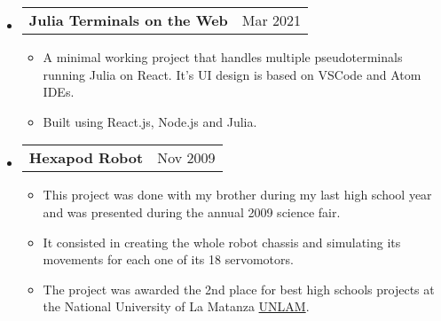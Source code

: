 \documentclass[letterpaper,12pt]{article}[leftmargin=*]
\makeatletter
\def \entryspacing {-0pt}
\newcommand{\resumeEntryStart}{\begin{itemize}[leftmargin=2.5mm]}
\newcommand{\resumeEntryEnd}{\end{itemize}\vspace{\entryspacing}}
\newcommand{\resumeItemListStart}{\begin{itemize}[leftmargin=4.5mm]}
\newcommand{\resumeItemListEnd}{\end{itemize}}
\newcommand{\resumeItem}[1]{
  \item\small{
    {#1 \vspace{-2pt}}
  }
}
\newcommand{\resumeEntryTD}[2]{
  \vspace{-1pt}\item[]
    \begin{tabularx}{0.97\textwidth}{X@{\hspace{60pt}}r}
      \textbf{\color{primary}#1} & {\firabook\color{accent}\small#2} \\
    \end{tabularx}\vspace{-6pt}
}
\makeatother
\begin{document}
     \resumeEntryStart
  \resumeEntryTD
      {Julia Terminals on the Web \href{https://mattborghi.github.io/projects/Julia\%20Terminal\%20Web/}{\faGithub}}{Mar 2021}
    \resumeItemListStart
      \resumeItem {A minimal working project that handles multiple pseudoterminals running Julia on React. It’s UI design is based on VSCode and Atom IDEs.}
      \resumeItem{Built using React.js, Node.js and Julia.}
  \resumeItemListEnd
  \resumeEntryEnd


  
  
\resumeEntryStart
   \resumeEntryTD
      {Hexapod Robot \href{https://mattborghi.github.io/projects/Hexapod\%20Robot/}{\faGithub}}{Nov 2009}
    \resumeItemListStart
      \resumeItem {This project was done with my brother during my last high school year and was presented during the annual 2009 science fair.}
      \resumeItem {It consisted in creating the whole robot chassis and simulating its movements for each one of its 18 servomotors.}
      \resumeItem {The project was awarded the 2nd place for best high schools projects at the National University of La Matanza \href{https://www.unlam.edu.ar/}{UNLAM}. }
  \resumeItemListEnd
  \resumeEntryEnd
  
\end{document}
